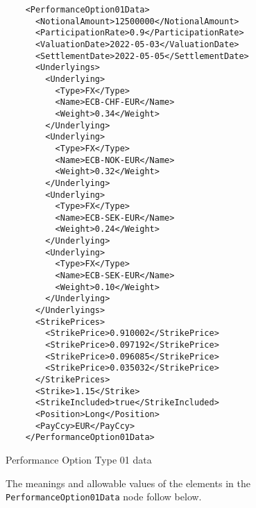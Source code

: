 \begin{listing}[H]
\begin{verbatim}
    <PerformanceOption01Data>
      <NotionalAmount>12500000</NotionalAmount>
      <ParticipationRate>0.9</ParticipationRate>
      <ValuationDate>2022-05-03</ValuationDate>
      <SettlementDate>2022-05-05</SettlementDate>
      <Underlyings>
        <Underlying>
          <Type>FX</Type>
          <Name>ECB-CHF-EUR</Name>
          <Weight>0.34</Weight>
        </Underlying>
        <Underlying>
          <Type>FX</Type>
          <Name>ECB-NOK-EUR</Name>
          <Weight>0.32</Weight>
        </Underlying>
        <Underlying>
          <Type>FX</Type>
          <Name>ECB-SEK-EUR</Name>
          <Weight>0.24</Weight>
        </Underlying>
        <Underlying>
          <Type>FX</Type>
          <Name>ECB-SEK-EUR</Name>
          <Weight>0.10</Weight>
        </Underlying>
      </Underlyings>
      <StrikePrices>
        <StrikePrice>0.910002</StrikePrice>
        <StrikePrice>0.097192</StrikePrice>
        <StrikePrice>0.096085</StrikePrice>
        <StrikePrice>0.035032</StrikePrice>
      </StrikePrices>
      <Strike>1.15</Strike>
      <StrikeIncluded>true</StrikeIncluded>
      <Position>Long</Position>
      <PayCcy>EUR</PayCcy>
    </PerformanceOption01Data>
\end{verbatim}
\caption{Performance Option Type 01 data}
\label{lst:performanceoption01_data}
\end{listing}

The meanings and allowable values of the elements in the \verb+PerformanceOption01Data+  node follow below.

